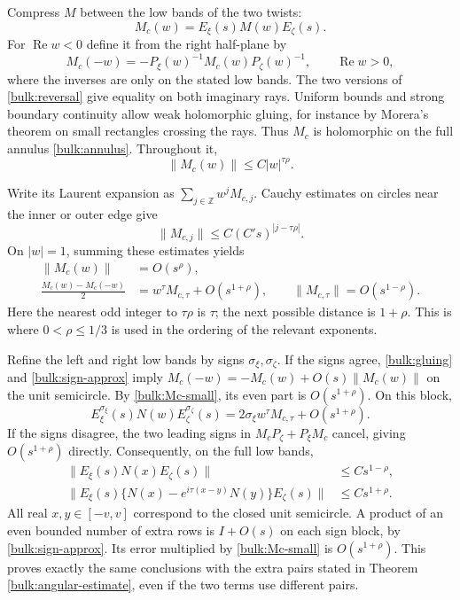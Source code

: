 Compress $M$ between the low bands of the two twists:
\[
 M_c(w)=E_\xi(s)M(w)E_\zeta(s).
\]
For $\operatorname{Re}w<0$ define it from the right half-plane by
\begin{equation}\label{bulk:gluing}
 M_c(-w)=-P_\xi(w)^{-1}M_c(w)P_\zeta(w)^{-1},
 \qquad \operatorname{Re}w>0,
\end{equation}
where the inverses are only on the stated low bands. The two
versions of \eqref{bulk:reversal} give equality on both imaginary
rays. Uniform bounds and strong boundary continuity allow weak
holomorphic gluing, for instance by Morera's theorem on small
rectangles crossing the rays. Thus $M_c$ is holomorphic on the
full annulus \eqref{bulk:annulus}. Throughout it,
\begin{equation}\label{bulk:Mc-bound}
 \|M_c(w)\|\le C|w|^{\tau\rho}.
\end{equation}

Write its Laurent expansion as $\sum_{j\in\mathbb Z}w^jM_{c,j}$.
Cauchy estimates on circles near the inner or outer edge give
\begin{equation}\label{bulk:Laurent}
 \|M_{c,j}\|\le C(C's)^{|j-\tau\rho|}.
\end{equation}
On $|w|=1$, summing these estimates yields
\begin{align}
 \|M_c(w)\|&=O(s^\rho),\label{bulk:Mc-small}\\
 \frac{M_c(w)-M_c(-w)}2
 &=w^\tau M_{c,\tau}+O(s^{1+\rho}),\qquad
 \|M_{c,\tau}\|=O(s^{1-\rho}).\label{bulk:odd-mode}
\end{align}
Here the nearest odd integer to $\tau\rho$ is $\tau$; the next
possible distance is $1+\rho$. This is where $0<\rho\le1/3$ is
used in the ordering of the relevant exponents.

Refine the left and right low bands by signs $\sigma_\xi,\sigma_\zeta$.
If the signs agree, \eqref{bulk:gluing} and
\eqref{bulk:sign-approx} imply
$M_c(-w)=-M_c(w)+O(s)\|M_c(w)\|$ on the unit semicircle.
By \eqref{bulk:Mc-small}, its even part is $O(s^{1+\rho})$.
On this block,
\[
 E_\xi^{\sigma_\xi}(s)N(w)E_\zeta^{\sigma_\zeta}(s)
 =2\sigma_\xi w^\tau M_{c,\tau}+O(s^{1+\rho}).
\]
If the signs disagree, the two leading signs in
$M_cP_\zeta+P_\xi M_c$ cancel, giving $O(s^{1+\rho})$ directly.
Consequently, on the full low bands,
\begin{align}
 \|E_\xi(s)N(x)E_\zeta(s)\|&\le Cs^{1-\rho},
 \label{bulk:low-band}\\
 \|E_\xi(s)\{N(x)-e^{i\tau(x-y)}N(y)\}E_\zeta(s)\|
 &\le Cs^{1+\rho}.\label{bulk:high-band}
\end{align}
All real $x,y\in[-v,v]$ correspond to the closed unit semicircle.
A product of an even bounded number of extra rows is $I+O(s)$ on
each sign block, by \eqref{bulk:sign-approx}. Its error multiplied
by \eqref{bulk:Mc-small} is $O(s^{1+\rho})$. This proves exactly
the same conclusions with the extra pairs stated in Theorem
\ref{bulk:angular-estimate}, even if the two terms use different
pairs.

